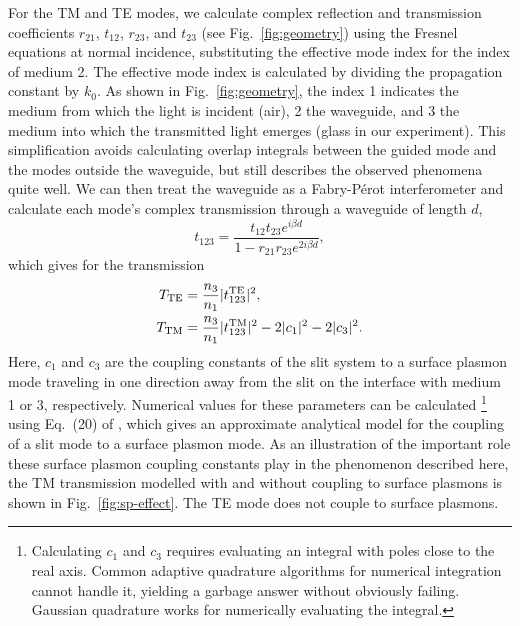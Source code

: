 For the \gls{TM} and \gls{TE} modes, we calculate complex reflection and transmission coefficients $r_{21}$, $t_{12}$, $r_{23}$, and $t_{23}$ (see Fig.~\ref{fig:geometry}) using the Fresnel equations at normal incidence, substituting the effective mode index for the index of medium 2.
The effective mode index is calculated by dividing the propagation constant by $k_0$.
As shown in Fig.~\ref{fig:geometry}, the index 1 indicates the medium from which the light is incident (air), 2 the waveguide, and 3 the medium into which the transmitted light emerges (glass in our experiment).
This simplification avoids calculating overlap integrals between the guided mode and the modes outside the waveguide, but still describes the observed phenomena quite well.
We can then treat the waveguide as a Fabry-P\'erot interferometer and calculate each mode's complex transmission through a waveguide of length $d$,
\begin{equation}
t_{123} = \frac{t_{12} t_{23} e^{i\beta d}}
	{1 - r_{21} r_{23} e^{2i\beta d}},
\end{equation}
which gives for the transmission
\begin{align}
T_{\text{TE}} &= \frac{n_3}{n_1}|t_{123}^{\text{TE}}|^2, \label{eq:tte} \\
T_{\text{TM}} &= \frac{n_3}{n_1}|t_{123}^{\text{TM}}|^2
	- 2 |c_1|^2
  	- 2 |c_3|^2. \label{eq:ttm}
\end{align}
Here, $c_1$ and $c_3$ are the coupling constants of the slit system to a surface plasmon mode traveling in one direction away from the slit on the interface with medium 1 or 3, respectively.
Numerical values for these parameters can be calculated%
\footnote{Calculating $c_1$ and $c_3$ requires evaluating an integral with poles close to the real axis.
Common adaptive quadrature algorithms for numerical integration cannot handle it, yielding a garbage answer without obviously failing.
Gaussian quadrature works for numerically evaluating the integral.}
using Eq.~(20) of \citeauthor{Lalanne2006}\cite{Lalanne2006}, which gives an approximate analytical model for the coupling of a slit mode to a surface plasmon mode.
As an illustration of the important role these surface plasmon coupling constants play in the phenomenon described here, the \gls{TM} transmission modelled with and without coupling to surface plasmons is shown in Fig.~\ref{fig:sp-effect}.
The \gls{TE} mode does not couple to surface plasmons.
%
